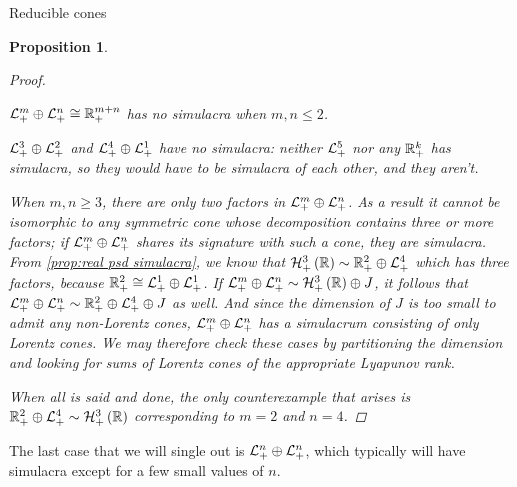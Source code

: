 \documentclass{interact}
\theoremstyle{plain}
\newtheorem{proposition}[theorem]{Proposition}
\theoremstyle{definition}
\theoremstyle{remark}
\begin{document}
\begin{section}{Reducible cones}
\begin{proposition}
\begin{proof}
        \begin{itemize}
          \begin{item}
            $\directsum{\Lnplus[m]}{\Lnplus} \cong \Rnplus[m+n]$ has
            no simulacra when $m,n \le 2$.
          \end{item}
          \begin{item}
            $\directsum{\Lnplus[3]}{\Lnplus[2]}$ and
            $\directsum{\Lnplus[4]}{\Lnplus[1]}$ have no simulacra:
            neither $\Lnplus[5]$ nor any $\Rnplus[k]$ has simulacra,
            so they would have to be simulacra of each other, and they
            aren't.
          \end{item}
          \begin{item}
            When $m,n \ge 3$, there are only two factors in
            $\directsum{\Lnplus[m]}{\Lnplus}$. As a result it cannot
            be isomorphic to any symmetric cone whose decomposition
            contains three or more factors; if
            $\directsum{\Lnplus[m]}{\Lnplus}$ shares its signature
            with such a cone, they are simulacra. From \cref{prop:real
              psd simulacra}, we know that $\Hnplus[3]\of{\Rn[1]} \sim
            \directsum{\Rnplus[2]}{\Lnplus[4]}$ which has three
            factors, because $\Rnplus[2] \cong
            \directsum{\Lnplus[1]}{\Lnplus[1]}$. If
            $\directsum{\Lnplus[m]}{\Lnplus} \sim
            \directsum{\Hnplus[3]\of{\Rn[1]}}{J}$, it follows that
            $\directsum{\Lnplus[m]}{\Lnplus} \sim
            \directsum{\directsum{\Rnplus[2]}{\Lnplus[4]}}{J}$ as
            well. And since the dimension of $J$ is too small to admit
            any non-Lorentz cones, $\directsum{\Lnplus[m]}{\Lnplus}$
            has a simulacrum consisting of only Lorentz cones. We may
            therefore check these cases by partitioning the dimension
            and looking for sums of Lorentz cones of the appropriate
            Lyapunov rank.
          \end{item}
        \end{itemize}

        When all is said and done, the only counterexample that arises
        is $\directsum{\Rnplus[2]}{\Lnplus[4]} \sim
        \Hnplus[3]\of{\Rn[1]}$ corresponding to $m = 2$ and $n = 4$.
      \end{proof}
    \end{proposition}

    The last case that we will single out is
    $\directsum{\Lnplus}{\Lnplus}$, which typically will have
    simulacra except for a few small values of $n$.


\end{section}
\end{document}
